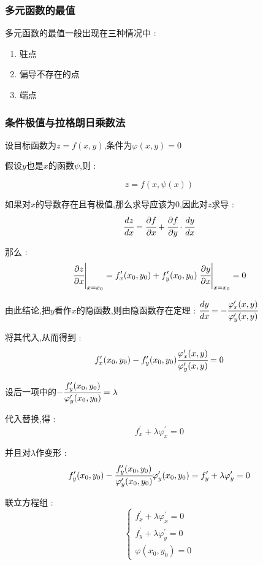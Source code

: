\documentclass[UTF8,12pt]{ctexbook}
\newcommand{\derivative}{^\prime}
\newcommand{\defFunction}[1]{f(#1)}
\newcommand{\directionDerivative}[3]{\left.\cfrac{\partial #1}{\partial #2}\right|_{#3}}
\newcommand{\partialDerivativeFrac}[2]{\cfrac{\partial #1}{\partial #2}}
\begin{document}
{{{  \subsubsection{多元函数的最值}{
    多元函数的最值一般出现在三种情况中 :

    \begin{enumerate}
      \item 驻点
      \item 偏导不存在的点
      \item 端点
    \end{enumerate}
  }%

  \subsubsection{条件极值与拉格朗日乘数法}{
    设目标函数为$z = \defFunction{x,y}$,条件为$\varphi(x,y) = 0$

    假设$y$也是$x$的函数$\psi$,则 :

    $$
      z = \defFunction{x,\psi(x)}
    $$

    如果对$x$的导数存在且有极值,那么求导应该为$0$,因此对$z$求导 :
    $$
      \cfrac{dz}{dx} = \partialDerivativeFrac{f}{x} + \partialDerivativeFrac{f}{y}\cdot\cfrac{dy}{dx}
    $$

    那么 :
    $$
      \directionDerivative{z}{x}{x = x_0} = f\derivative_x(x_0,y_0) + f\derivative_y(x_0,y_0)\directionDerivative{y}{x}{x = x_0} = 0
    $$

    由此结论,把$y$看作$x$的隐函数,则由隐函数存在定理 : $\cfrac{dy}{dx} = -\cfrac{\varphi\derivative_x(x,y)}{\varphi\derivative_y(x,y)}$

    将其代入,从而得到 :
    $$
      f\derivative_x(x_0,y_0) - f\derivative_y(x_0,y_0)\cfrac{\varphi\derivative_x(x,y)}{\varphi\derivative_y(x,y)} = 0
    $$

    设后一项中的$-\cfrac{f\derivative_y(x_0,y_0)}{\varphi\derivative_y(x_0,y_0)} = \lambda$

    代入替换,得 :
    $$
      f\derivative_x + \lambda\varphi\derivative_x = 0
    $$

    并且对$\lambda$作变形 :
    $$
      f\derivative_y(x_0,y_0) - \cfrac{f\derivative_y(x_0,y_0)}{\varphi\derivative_y(x_0,y_0)}\varphi\derivative_y(x_0,y_0) = f\derivative_y + \lambda\varphi\derivative_y = 0
    $$

    联立方程组 :
    $$
      \begin{cases}
        f\derivative_x + \lambda\varphi\derivative_x = 0 \\
        f\derivative_y + \lambda\varphi\derivative_y = 0 \\
        \varphi(x_0,y_0) = 0
      \end{cases}
    $$

}}}}
\end{document}
